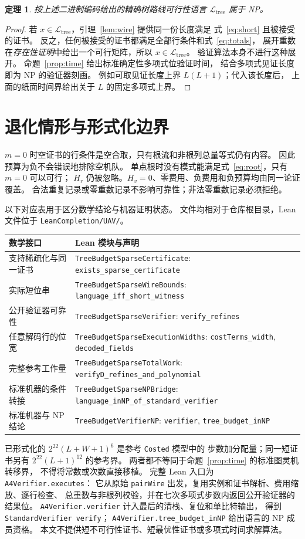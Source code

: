 \documentclass[UTF8,11pt]{ctexart}
\newtheorem{theorem}{定理}
\newcommand{\Lang}{\mathcal L_{\mathrm{tree}}}
\begin{document}
\begin{theorem}\label{thm:np}
按上述二进制编码给出的精确树路线可行性语言 $\Lang$ 属于 NP。
\end{theorem}
\begin{proof}
若 $x\in\Lang$，引理~\ref{lem:wire} 提供同一份长度满足
式~\eqref{eq:short} 且被接受的证书。
反之，任何被接受的证书都满足全部行条件和式~\eqref{eq:totals}，
展开重数在\emph{存在性证明}中给出一个可行矩阵，所以 $x\in\Lang$。
验证算法本身不进行这种展开。
命题~\ref{prop:time} 给出标准确定性多项式位验证时间，
结合多项式见证长度即为 NP 的验证器刻画。
例如可取见证长度上界 $L(L+1)$；代入该长度后，
上面的纸面时间界给出关于 $L$ 的固定多项式上界。
\end{proof}

\section{退化情形与形式化边界}

$m=0$ 时空证书的行条件是空合取，只有根流和非根列总量等式仍有内容。
因此预算为负不会错误地排除空机队。
单点根时没有模式能满足式~\eqref{eq:root}，只有 $m=0$ 可以可行；
$H_r$ 仍被忽略。$H_v=0$、零费用、负费用和负预算均由同一论证覆盖。
合法重复记录或零重数记录不影响可靠性；非法零重数记录必须拒绝。

以下对应表用于区分数学结论与机器证明状态。
文件均相对于仓库根目录，Lean 文件位于 \texttt{LeanCompletion/UAV/}。
\begin{center}\small
\begin{tabular}{p{}p{}}
数学接口 & Lean 模块与声明\\\hline
支持稀疏化与同一证书 & \texttt{TreeBudgetSparseCertificate}: \texttt{exists\_sparse\_certificate}\\
实际短位串 & \texttt{TreeBudgetSparseWireBounds}: \texttt{language\_iff\_short\_witness}\\
公开验证器可靠性 & \texttt{TreeBudgetSparseVerifier}: \texttt{verify\_refines}\\
任意解码行的位宽 & \texttt{TreeBudgetSparseExecutionWidths}: \texttt{costTerms\_width}, \texttt{decoded\_fields}\\
完整参考工作量 & \texttt{TreeBudgetSparseTotalWork}: \texttt{verifyD\_refines\_and\_polynomial}\\
标准机器的条件转接 & \texttt{TreeBudgetSparseNPBridge}: \texttt{language\_inNP\_of\_standard\_verifier}\\
标准机器与 NP 结论 & \texttt{TreeBudgetVerifierNP}: \texttt{verifier}, \texttt{tree\_budget\_inNP}
\end{tabular}
\end{center}

已形式化的 $2^{22}(L+W+1)^6$ 是参考 \texttt{Costed} 模型中的
步数加分配量；同一短证书另有 $2^{22}(L+1)^{12}$ 的参考界。
两者都不等同于命题~\ref{prop:time} 的标准图灵机转移界，
不得将常数或次数直接移植。
完整 Lean 入口为 \texttt{A4Verifier.executes}：
它从原始 \texttt{pairWire} 出发，复用实例和证书解析、费用缩放、逐行检查、
总重数与非根列校验，并在七次多项式步数内返回公开验证器的结果位。
\texttt{A4Verifier.verifier} 计入最后的清栈、复位和单比特输出，
得到 \texttt{StandardVerifier verify}；
\texttt{A4Verifier.tree\_budget\_inNP} 给出语言的 NP 成员资格。
本文不提供短不可行性证书、短最优性证书或多项式时间求解算法。
\end{document}
